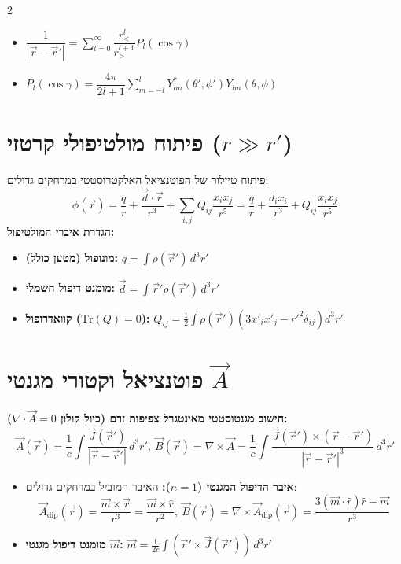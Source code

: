 \documentclass[10pt,a4paper]{article}
\begin{document}
\begin{multicols*}{2}
\begin{itemize}
\begin{itemize}
        \item $
    \dfrac{1}{|\vec{r} - \vec{r}'|} = \sum_{l=0}^{\infty} \dfrac{r_<^l}{r_>^{l+1}} P_l(\cos\gamma)$
      \item $
      P_l(\cos\gamma) = \dfrac{4\pi}{2l+1} \sum_{m=-l}^{l} Y_{lm}^*(\theta', \phi') Y_{lm}(\theta, \phi)
      $
    \end{itemize}
\end{itemize}

\section*{פיתוח מולטיפולי קרטזי ($r \gg r'$)}
\noindent
פיתוח טיילור של הפוטנציאל האלקטרוסטטי במרחקים גדולים:
\[
\phi(\vec{r}) = \frac{q}{r} + \frac{\vec{d} \cdot \vec{r}}{r^3} + \sum_{i,j} Q_{ij} \frac{x_i x_j}{r^5} = \dfrac{q}{r} + \dfrac{d_i x_i}{r^3} + Q_{ij} \dfrac{x_i x_j}{r^5}
\]
\noindent
\textbf{הגדרת איברי המולטיפול:}
\begin{itemize}
    \item \textbf{מונופול (מטען כולל):} $q = \int \rho(\vec{r}') \, d^3r'$
    \item \textbf{מומנט דיפול חשמלי:} $\vec{d} = \int \vec{r}' \rho(\vec{r}') \, d^3r'$
    \item \textbf{קוואדרופול ($\text{Tr}(Q)=0$):} 
    $
    Q_{ij} = \frac{1}{2} \int \rho(\vec{r}') \left( 3x'_i x'_j - r'^2 \delta_{ij} \right) d^3r'
    $
\end{itemize}

\section*{פוטנציאל וקטורי מגנטי $\vec{A}$}
\noindent
\textbf{חישוב מגנטוסטטי מאינטגרל צפיפות זרם (כיול קולון $\nabla \cdot \vec{A} = 0$):}
\noindent
{\small\[\vec{A}(\vec{r}) = \frac{1}{c} \int \frac{\vec{J}(\vec{r}')}{|\vec{r} - \vec{r}'|} \, d^3r', \ \vec{B}(\vec{r}) = \nabla \times \vec{A} = \frac{1}{c} \int \frac{\vec{J}(\vec{r}') \times (\vec{r} - \vec{r}')}{|\vec{r} - \vec{r}'|^3} \, d^3r'\]}
\begin{itemize}
    \item \textbf{איבר הדיפול המגנטי ($n=1$):} האיבר המוביל במרחקים גדולים:
    \[
    \vec{A}_{\text{dip}}(\vec{r}) = \frac{\vec{m} \times \vec{r}}{r^3} = \frac{\vec{m} \times \hat{r}}{r^2}, \ \vec{B}(\vec{r}) = \nabla \times \vec{A}_{\text{dip}}(\vec{r}) = \frac{3(\vec{m} \cdot \hat{r})\hat{r} - \vec{m}}{r^3}
    \]
    \item \textbf{מומנט דיפול מגנטי $\vec{m}$:}
$
\vec{m} = \frac{1}{2c} \int (\vec{r}' \times \vec{J}(\vec{r}')) \, d^3r'
$
\end{itemize}


\end{multicols*}
\end{document}
